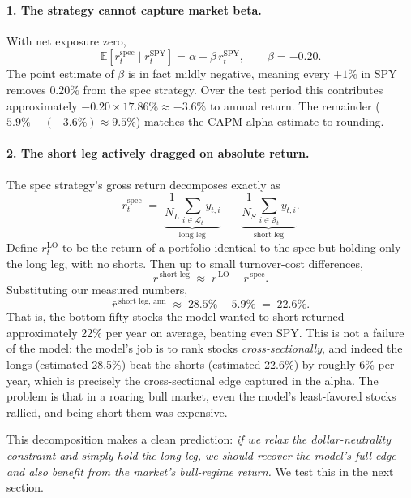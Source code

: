 \documentclass[11pt]{article}
\begin{document}
\paragraph{1. The strategy cannot capture market beta.} With net exposure zero,
\begin{equation}
\mathbb{E}[r^{\text{spec}}_t \mid r^{\text{SPY}}_t] = \alpha + \beta\, r^{\text{SPY}}_t,
\qquad \beta = -0.20.
\end{equation}
The point estimate of $\beta$ is in fact mildly negative, meaning every $+1\%$ in SPY
removes $0.20\%$ from the spec strategy. Over the test period this contributes
approximately $-0.20 \times 17.86\% \approx -3.6\%$ to annual return. The remainder
($5.9\% - (-3.6\%) \approx 9.5\%$) matches the CAPM alpha estimate to rounding.

\paragraph{2. The short leg actively dragged on absolute return.} The spec strategy's
gross return decomposes exactly as
\begin{equation}
r^{\text{spec}}_t \;=\; \underbrace{\frac{1}{N_L}\sum_{i \in \mathcal{L}_t} y_{t,i}}_{\text{long leg}}
\;-\; \underbrace{\frac{1}{N_S}\sum_{i \in \mathcal{S}_t} y_{t,i}}_{\text{short leg}}.
\end{equation}
Define $r^{\text{LO}}_t$ to be the return of a portfolio identical to the spec but holding
only the long leg, with no shorts. Then up to small turnover-cost differences,
\begin{equation}
\bar r^{\,\text{short leg}} \;\approx\; \bar r^{\,\text{LO}} - \bar r^{\,\text{spec}}.
\end{equation}
Substituting our measured numbers,
\begin{equation}
\bar r^{\,\text{short leg, ann}} \;\approx\; 28.5\% - 5.9\% \;=\; 22.6\%.
\end{equation}
That is, the bottom-fifty stocks the model wanted to short returned approximately 22\%
per year on average, beating even SPY. This is not a failure of the model: the model's
job is to rank stocks \emph{cross-sectionally}, and indeed the longs (estimated 28.5\%)
beat the shorts (estimated 22.6\%) by roughly 6\% per year, which is precisely the
cross-sectional edge captured in the alpha. The problem is that in a roaring bull
market, even the model's least-favored stocks rallied, and being short them was
expensive.

This decomposition makes a clean prediction: \emph{if we relax the dollar-neutrality
constraint and simply hold the long leg, we should recover the model's full edge and
also benefit from the market's bull-regime return.} We test this in the next section.
\end{document}
